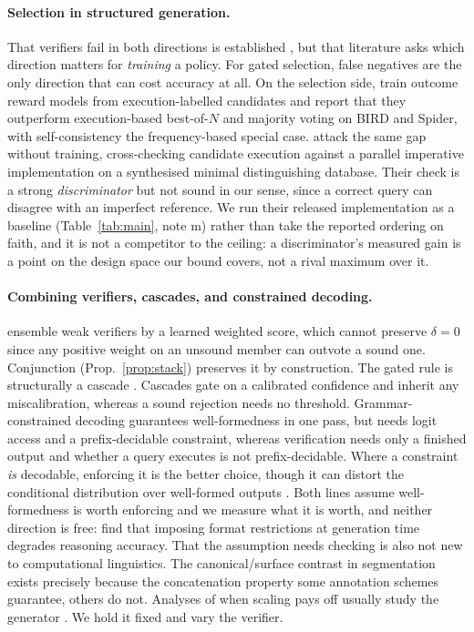 \documentclass[11pt]{article}
\begin{document}
\paragraph{Selection in structured generation.} That verifiers fail in both
directions is established \citep{cai2025noisy,tinyv2025,onetoken2025}, but that
literature asks which direction matters for \emph{training} a policy. For gated
selection, false negatives are the only direction that can cost accuracy at all.
On the selection side, \citet{gradesql2026} train outcome reward models from
execution-labelled candidates and report that they outperform execution-based
best-of-$N$ and majority voting on BIRD and Spider, with self-consistency
\citep{wang2023self} the frequency-based special case. \citet{dpc2026} attack the same gap without training, cross-checking candidate
execution against a parallel imperative implementation on a synthesised
minimal distinguishing database. Their check is a strong
\emph{discriminator} but not sound in our sense, since a correct query can
disagree with an imperfect reference. We run their released implementation
as a baseline (Table~\ref{tab:main}, note m) rather than take the reported
ordering on faith, and it is not a competitor to the ceiling: a
discriminator's measured gain is a point on the design space our bound
covers, not a rival maximum over it.

\paragraph{Combining verifiers, cascades, and constrained decoding.}
\citet{saadfalcon2025weaver} ensemble weak verifiers by a learned weighted score,
which cannot preserve $\delta=0$ since any positive weight on an unsound member
can outvote a sound one. Conjunction (Prop.~\ref{prop:stack}) preserves it by
construction. The gated rule is structurally a cascade
\citep{chow1957recognition,elyaniv2010foundations,geifman2017selective,chen2023frugalgpt}.
Cascades gate on a calibrated confidence and inherit any miscalibration, whereas
a sound rejection needs no threshold. Grammar-constrained decoding
\citep{geng2023grammar,park2024grammar} guarantees well-formedness in one pass,
but needs logit access and a prefix-decidable constraint, whereas verification
needs only a finished output and whether a query executes is not
prefix-decidable. Where a constraint \emph{is} decodable, enforcing it is the
better choice, though it can distort the conditional distribution over
well-formed outputs \citep{park2024grammar}. Both lines assume well-formedness is
worth enforcing and we measure what it is worth, and neither direction is free:
\citet{tam2024format} find that imposing format restrictions at generation time
degrades reasoning accuracy. That the assumption needs checking is also not new
to computational linguistics. The canonical/surface contrast in segmentation
\citep{cotterell2016canonical} exists precisely because the concatenation
property some annotation schemes guarantee, others do not. Analyses of when
scaling pays off usually study the generator \citep{brown2024monkeys}. We hold it
fixed and vary the verifier.
\end{document}
